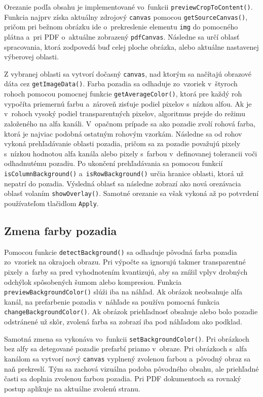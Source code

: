 Orezanie podľa obsahu je implementované vo~funkcii \texttt{previewCropToContent()}. Funkcia najprv získa aktuálny zdrojový \texttt{canvas} pomocou \texttt{getSourceCanvas()}, pričom pri bežnom obrázku ide o~prekreslenie elementu \texttt{img} do pomocného plátna a~pri PDF o~aktuálne zobrazený \texttt{pdfCanvas}. Následne sa určí oblasť spracovania, ktorá zodpovedá buď celej ploche obrázka, alebo aktuálne nastavenej výberovej oblasti.

Z vybranej oblasti sa vytvorí dočasný \texttt{canvas}, nad ktorým sa načítajú obrazové dáta cez \texttt{getImageData()}. Farba pozadia sa odhaduje zo~vzoriek v~štyroch rohoch pomocou pomocnej funkcie \texttt{getAverageColor()}, ktorá pre každý roh vypočíta priemernú farbu a~zároveň zisťuje podiel pixelov s~nízkou alfou. Ak je v~rohoch vysoký podiel transparentných pixelov, algoritmus prejde do režimu založeného na alfa kanáli. V~opačnom prípade sa ako pozadie zvolí rohová farba, ktorá je najviac podobná ostatným rohovým vzorkám. Následne sa od rohov vykoná prehľadávanie oblasti pozadia, pričom sa za pozadie považujú pixely s~nízkou hodnotou alfa kanála alebo pixely s~farbou v~definovanej tolerancii voči odhadnutému pozadiu. Po ukončení prehľadávania sa pomocou funkcií \texttt{isColumnBackground()} a~\texttt{isRowBackground()} určia hranice oblasti, ktorá už nepatrí do pozadia. Výsledná oblasť sa následne zobrazí ako nová orezávacia oblasť volaním \texttt{showOverlay()}. Samotné orezanie sa však vykoná až po potvrdení používateľom tlačidlom \texttt{Apply}.

\subsection{Zmena farby pozadia}

Pomocou funkcie \texttt{detectBackground()} sa odhaduje pôvodná farba pozadia zo~vzoriek na okrajoch obrazu. Pri výpočte sa ignorujú takmer transparentné pixely a~farby sa pred vyhodnotením kvantizujú, aby sa znížil vplyv drobných odchýlok spôsobených šumom alebo kompresiou. Funkcia \texttt{previewBackgroundColor()} slúži iba na náhľad. Ak obrázok neobsahuje alfa kanál, na prefarbenie pozadia v~náhľade sa používa pomocná funkcia \texttt{changeBackgroundColor()}. Ak obrázok priehľadnosť obsahuje alebo bolo pozadie odstránené už skôr, zvolená farba sa zobrazí iba pod náhľadom ako podklad.

Samotná zmena sa vykonáva vo~funkcii \texttt{setBackgroundColor()}. Pri obrázkoch bez alfy sa detegované pozadie prefarbí priamo v~obraze. Pri obrázkoch s~alfa kanálom sa vytvorí nový \texttt{canvas} vyplnený zvolenou farbou a~pôvodný obraz sa naň prekreslí. Tým sa zachová vizuálna podoba pôvodného obsahu, ale priehľadné časti sa doplnia zvolenou farbou pozadia. Pri PDF dokumentoch sa rovnaký postup aplikuje na aktuálne zvolenú stranu. 

